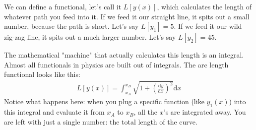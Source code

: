 We can define a functional, let's call it $L[y(x)]$, which calculates the length of whatever path you feed into it. 
If we feed it our straight line, it spits out a small number, because the path is short. Let's say $L[y_1] = 5$.
If we feed it our wild zig-zag line, it spits out a much larger number. Let's say $L[y_2] = 45$.

The mathematical "machine" that actually calculates this length is an integral. Almost all functionals in physics are built out of integrals. The arc length functional looks like this:
\begin{align}
    L[y(x)] = \int_{x_A}^{x_B} \sqrt{1 + \left( \frac{\text{d}y}{\text{d}x} \right)^2} \text{d}x
\end{align}
Notice what happens here: when you plug a specific function (like $y_1(x)$) into this integral and evaluate it from $x_A$ to $x_B$, all the $x$'s are integrated away. You are left with just a single number: the total length of the curve.
